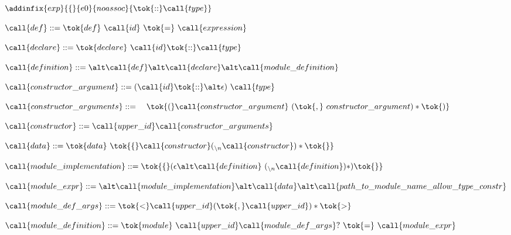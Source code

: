  
   \item $\addinfix{exp}{\{}{e0}{noassoc}{\tok{::}\call{type}}$
    
 
   \item $\call{def} ::= \tok{def}\ \call{id}\ \tok{=}\ \call{expression}$
    
 
   \item $\call{declare} ::= \tok{declare}\ \call{id}\tok{::}\call{type}$
    
 
   \item $\call{definition} ::= \\
   \alt \call{def}\\
   \alt \call{declare}\\
   \alt \call{module\_definition}$
    
 
  \item $\call{constructor\_argument} ::= 
    ( \call{id} \tok{::} \alt \epsilon)\ \call{type}$
  \item $\call{constructor\_arguments} ::=\\
   \quad\tok{(} \call{constructor\_argument}\ ( \tok{,}\ {constructor\_argument} )* \tok{)}$ 
    
 
   \item $\call{constructor} ::= \call{upper\_id}\call{constructor\_arguments}$
    

  \item $\call{data} ::= \tok{data}\ \tok{\{} \call{constructor} ({}_{\backslash{}n} \call{constructor} )* \tok{\}}$
   
 
   \item $\call{module\_implementation} ::= \tok{\{} (\epsilon \alt
   \call{definition}\ ({}_{\backslash{}n}\call{definition})* ) \tok{\}}$
    
 
   \item $\call{module\_expr} ::=\\
   \alt \call{module\_implementation}\\
   \alt \call{data}\\
   \alt \call{path\_to\_module\_name\_allow\_type\_constr}$
    
 
   \item $\call{module\_def\_args} ::= \tok{<} \call{upper\_id}
   (\tok{,} \call{upper\_id})* \tok{>}$\\
   \item $\call{module\_definition} ::= 
   \tok{module}\ \call{upper\_id}\call{module\_def\_args}?\ \tok{=}\ \call{module\_expr}$
    
